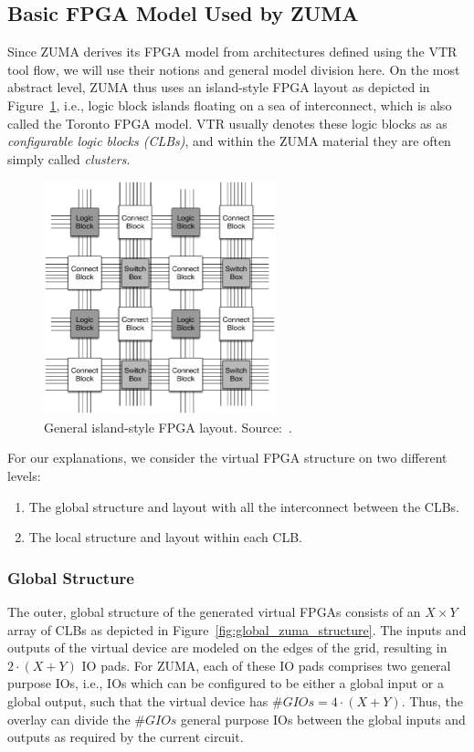 \documentclass{article}
\begin{document}
\subsection{Basic FPGA Model Used by ZUMA}
Since ZUMA derives its FPGA model from architectures defined using the VTR tool flow, we will use their notions and general model division here.
On the most abstract level, ZUMA thus uses an island-style FPGA layout as depicted in Figure~\ref{fig:island-style_fpga}, i.e., logic block islands floating on a sea of interconnect, which is also called the Toronto FPGA model.
VTR usually denotes these logic blocks as as \emph{configurable logic blocks (CLBs)}, and within the ZUMA material they are often simply called \emph{clusters}.

\begin{figure}[htp]
    \centering
    \includegraphics[width=0.6\textwidth]{Figures/island_style}%
    \caption{General island-style FPGA layout. Source:~\cite{ComptonH2002Reconfigurablecomputingsurvey}.}
    \label{fig:island-style_fpga}
\end{figure}

For our explanations, we consider the virtual FPGA structure on two different levels:
\begin{enumerate}
    \item The global structure and layout with all the interconnect between the CLBs.
    \item The local structure and layout within each CLB.
\end{enumerate}

\subsubsection{Global Structure}
The outer, global structure of the generated virtual FPGAs consists of an \(X \times Y\) array of CLBs as depicted in Figure~\ref{fig:global_zuma_structure}.
The inputs and outputs of the virtual device are modeled on the edges of the grid, resulting in \({2 \cdot (X + Y)}\) IO pads.
For ZUMA, each of these IO pads comprises two general purpose IOs, i.e., IOs which can be configured to be either a global input or a global output, such that the virtual device has \({\#GIOs = 4 \cdot (X + Y)}\).
Thus, the overlay can divide the \(\#GIOs\) general purpose IOs between the global inputs and outputs as required by the current circuit.
\end{document}
